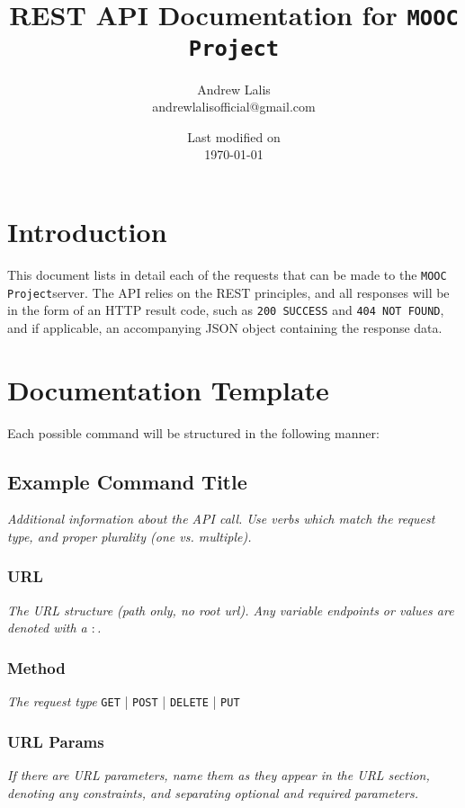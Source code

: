 \documentclass[a4paper, 12pt]{article}
\newcommand{\projectTitle}{\texttt{MOOC Project}}
\begin{document}
\title{REST API Documentation for \projectTitle}
\author{Andrew Lalis\\ andrewlalisofficial@gmail.com}
\date{Last modified on\\ \today}
\maketitle

\setcounter{tocdepth}{2}
\tableofcontents

\section{Introduction}
	This document lists in detail each of the requests that can be made to the \projectTitle server. The API relies on the REST principles, and all responses will be in the form of an HTTP result code, such as \texttt{200 SUCCESS} and \texttt{404 NOT FOUND}, and if applicable, an accompanying JSON object containing the response data.

\section{Documentation Template}
	Each possible command will be structured in the following manner:\\
	\subsection{Example Command Title}
		\textit{Additional information about the API call. Use verbs which match the request type, and proper plurality (one vs. multiple).}

		\subsubsection{URL}
			\textit{The URL structure (path only, no root url). Any variable endpoints or values are denoted with a $ : $.}

		\subsubsection{Method}
			\textit{The request type}
			\texttt{GET} | \texttt{POST} | \texttt{DELETE} | \texttt{PUT}

		\subsubsection{URL Params}
			\textit{If there are URL parameters, name them as they appear in the URL section, denoting any constraints, and separating optional and required parameters.}
\end{document}
